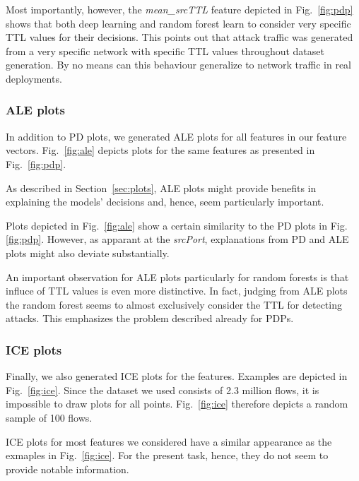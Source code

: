 \documentclass[sigconf,nonacm]{acmart}
\begin{document}
Most importantly, however, the \textit{mean\_srcTTL} feature depicted in Fig.~\ref{fig:pdp} shows that both deep learning and random forest learn to consider very specific TTL values for their decisions. This points out that attack traffic was generated from a very specific network with specific TTL values throughout dataset generation.
By no means can this behaviour generalize to network traffic in real deployments.

\subsubsection{ALE plots}
In addition to PD plots, we generated ALE plots for all features in our feature vectors. Fig.~\ref{fig:ale} depicts plots for the same features as presented in Fig.~\ref{fig:pdp}.

As described in Section~\ref{sec:plots}, ALE plots might provide benefits in explaining the models' decisions and, hence, seem particularly important.

Plots depicted in Fig.~\ref{fig:ale} show a certain similarity to the PD plots in Fig.\ref{fig:pdp}. However, as apparant at the \textit{srcPort}, explanations from PD and ALE plots might also deviate substantially. 

An important observation for ALE plots particularly for random forests is that influce of TTL values is even more distinctive. In fact, judging from ALE plots the random forest seems to almost exclusively consider the TTL for detecting attacks. This emphasizes the problem described already for PDPs.

\subsubsection{ICE plots}
Finally, we also generated ICE plots for the features. Examples are depicted in Fig.~\ref{fig:ice}. Since the dataset we used consists of 2.3 million flows, it is impossible to draw plots for all points. Fig.~\ref{fig:ice} therefore depicts a random sample of 100 flows.

ICE plots for most features we considered have a similar appearance as the exmaples in Fig.~\ref{fig:ice}. For the present task, hence, they do not seem to provide notable information.
\end{document}
